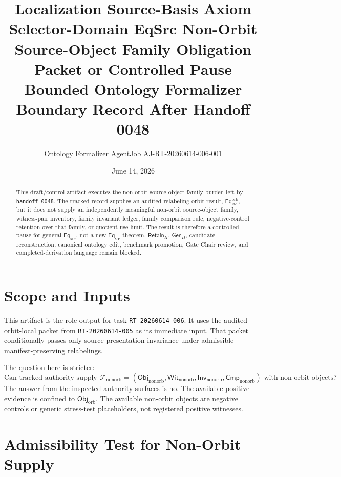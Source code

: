 \documentclass[11pt]{article}
\title{\textbf{Localization Source-Basis Axiom Selector-Domain EqSrc Non-Orbit Source-Object Family Obligation Packet or Controlled Pause}\\[0.35em]
\large Bounded Ontology Formalizer Boundary Record After Handoff 0048}
\author{Ontology Formalizer AgentJob AJ-RT-20260614-006-001}
\date{June 14, 2026}
\newcommand{\ObjOrb}{\mathsf{Obj}_{\mathrm{orb}}}
\newcommand{\ObjNon}{\mathsf{Obj}_{\mathrm{nonorb}}}
\newcommand{\FamNon}{\mathcal{F}_{\mathrm{nonorb}}}
\newcommand{\InvNon}{\mathsf{Inv}_{\mathrm{nonorb}}}
\newcommand{\CmpNon}{\mathsf{Cmp}_{\mathrm{nonorb}}}
\newcommand{\WitNon}{\mathsf{Wit}_{\mathrm{nonorb}}}
\newcommand{\EqSrc}{\mathsf{Eq}_{\mathrm{src}}}
\newcommand{\EqOrb}{\mathsf{Eq}_{\mathrm{src}}^{\mathrm{orb}}}
\newcommand{\GenH}{\mathsf{Gen}_{H}}
\newcommand{\RetainH}{\mathsf{Retain}_{H}}
\begin{document}
\maketitle

\begin{abstract}
This draft/control artifact executes the non-orbit source-object family
burden left by \texttt{handoff-0048}. The tracked record supplies an
audited relabeling-orbit result, \(\EqOrb\), but it does not supply an
independently meaningful non-orbit source-object family, witness-pair
inventory, family invariant ledger, family comparison rule,
negative-control retention over that family, or quotient-use limit. The
result is therefore a controlled pause for general \(\EqSrc\), not a new
\(\EqSrc\) theorem. \(\RetainH\), \(\GenH\), candidate reconstruction,
canonical ontology edit, benchmark promotion, Gate Chair review, and
completed-derivation language remain blocked.
\end{abstract}

\section{Scope and Inputs}

This artifact is the role output for task \texttt{RT-20260614-006}. It
uses the audited orbit-local packet from \texttt{RT-20260614-005} as its
immediate input. That packet conditionally passes only source-presentation
invariance under admissible manifest-preserving relabelings.

The question here is stricter:
\[
    \text{Can tracked authority supply } \FamNon
    =(\ObjNon,\WitNon,\InvNon,\CmpNon)
    \text{ with non-orbit objects?}
\]
The answer from the inspected authority surfaces is no. The available
positive evidence is confined to \(\ObjOrb\). The available non-orbit
objects are negative controls or generic stress-test placeholders, not
registered positive witnesses.

\section{Admissibility Test for Non-Orbit Supply}
\end{document}
